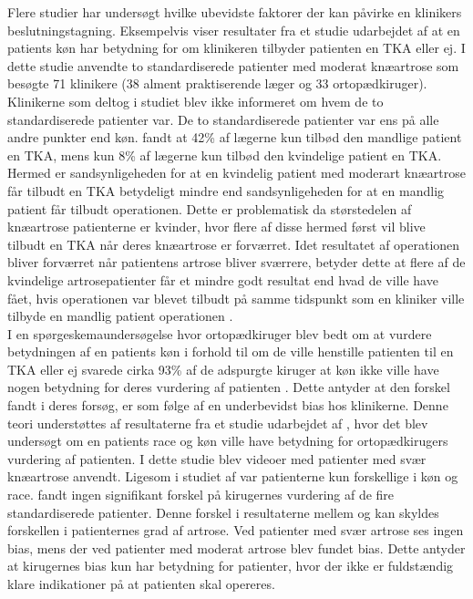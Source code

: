 Flere studier har undersøgt hvilke ubevidste faktorer der kan påvirke en klinikers beslutningstagning. Eksempelvis viser resultater fra et studie udarbejdet af \cite{borkhoff2008} at en patients køn har betydning for om klinikeren tilbyder patienten en TKA eller ej. I dette studie anvendte \cite{borkhoff2008} to standardiserede patienter med moderat knæartrose som besøgte 71 klinikere (38 alment praktiserende læger og 33 ortopædkiruger). Klinikerne som deltog i studiet blev ikke informeret om hvem de to standardiserede patienter var. De to standardiserede patienter var ens på alle andre punkter end køn. \cite{borkhoff2008} fandt at 42\% af lægerne kun tilbød den mandlige patient en TKA, mens kun 8\% af lægerne kun tilbød den kvindelige patient en TKA. Hermed er sandsynligeheden for at en kvindelig patient med moderart knæartrose får tilbudt en TKA betydeligt mindre end sandsynligeheden for at en mandlig patient får tilbudt operationen. Dette er problematisk da størstedelen af knæartrose patienterne er kvinder, hvor flere af disse hermed først vil blive tilbudt en TKA når deres knæartrose er forværret. Idet resultatet af operationen bliver forværret når patientens artrose bliver sværrere, betyder dette at flere af de kvindelige artrosepatienter får et mindre godt resultat end hvad de ville have fået, hvis operationen var blevet tilbudt på samme tidspunkt som en kliniker ville tilbyde en mandlig patient operationen \citep{borkhoff2008}. \\
I en spørgeskemaundersøgelse hvor ortopædkiruger blev bedt om at vurdere betydningen af en patients køn i forhold til om de ville henstille patienten til en TKA eller ej svarede cirka 93\% af de adspurgte kiruger at køn ikke ville have nogen betydning for deres vurdering af patienten \citep{wright1995}. Dette antyder at den forskel \cite{borkhoff2008} fandt i deres forsøg, er som følge af en underbevidst bias hos klinikerne. Denne teori understøttes af resultaterne fra et studie udarbejdet af \cite{dy2014}, hvor det blev undersøgt om en patients race og køn ville have betydning for ortopædkirugers vurdering af patienten. I dette studie blev videoer med patienter med svær knæartrose anvendt. Ligesom i studiet af \cite{borkhoff2008} var patienterne kun forskellige i køn og race. \cite{dy2014} fandt ingen signifikant forskel på kirugernes vurdering af de fire standardiserede patienter. Denne forskel i resultaterne mellem \cite{borkhoff2008} og \cite{dy2014} kan skyldes forskellen i patienternes grad af artrose. Ved patienter med svær artrose ses ingen bias, mens der ved patienter med moderat artrose blev fundet bias. Dette antyder at kirugernes bias kun har betydning for patienter, hvor der ikke er fuldstændig klare indikationer på at patienten skal opereres. \\
